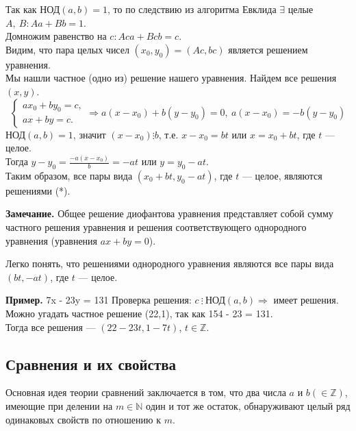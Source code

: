 \documentclass{article}
\begin{document}
            Так как \( \textrm{НОД}(a, b) = 1 \), то по следствию из алгоритма Евклида \( \exists \) целые \( A,\ B: Aa + Bb = 1 \).\\
            Домножим равенство на \( c: Aca + Bcb = c \).\\
            Видим, что пара целых чисел \( (x_0,y_0) = (Ac, bc) \) является решением уравнения.\\
            Мы нашли частное (одно из) решение нашего уравнения. Найдем все решения \( (x,y) \).\\

            \[ \begin{cases}
                ax_0 + by_0 = c,\\
                ax + by = c.
            \end{cases} \Rightarrow a(x - x_0) + b(y - y_0) = 0,\ a(x - x_0) = -b(y - y_0) \]
            \( \textrm{НОД}(a,b) = 1 \), значит \( (x - x_0) \vdots b \), т.е. \( x - x_0 = bt \) или \( x = x_0 + bt \), где \( t \) --- целое.\\
            Тогда \( y - y_0 = \frac{-a(x - x_0)}{b} = -at \) или \( y = y_0 - at \).\\
            Таким образом, все пары вида \( (x_0 + bt, y_0 - at) \), где \( t \) --- целое, являются решениями (*).

            \textbf{Замечание.} Общее решение диофантова уравнения представляет собой сумму частного решения уравнения и решения соответствующего однородного уравнения (уравнения \( ax + by = 0 \)).

            Легко понять, что решениями однородного уравнения являются все пары вида \( (bt, -at) \), где \( t \) --- целое.

            \textbf{Пример.} 7x - 23y = 131
            Проверка решения: \( c\ \vdots \ \textrm{НОД}(a,b) \Rightarrow \) имеет решения.\\ 
            Можно угадать частное решение (22,1), так как 154 - 23 = 131.\\
            Тогда все решения --- \( (22-23t,1-7t) \), \( t \in \mathbb{Z} \).

        \subsection{Сравнения и их свойства}
        	Основная идея теории сравнений заключается в том, что два числа \( a \) и \( b (\in \mathbb{Z}) \), имеющие при делении на \( m \in \mathbb{N} \) один и тот же остаток, обнаруживают целый ряд одинаковых свойств по отношению к \( m \).
\end{document}

